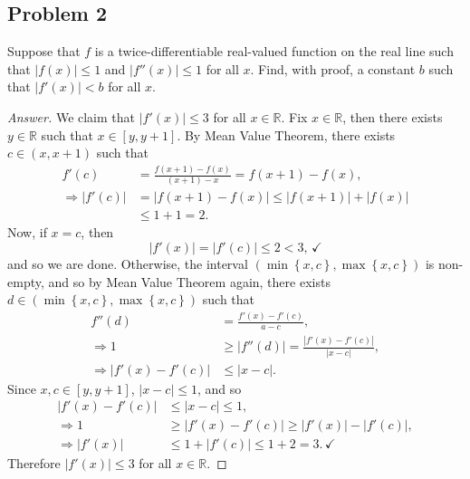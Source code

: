 \documentclass[12pt]{article}
\newcommand{\real}{\mathbb{R}}
\newcommand\paren[1]{\left( #1 \right)}
\newcommand\setb[1]{\left \{ #1 \right \}}
\newcommand{\abs}[1]{\left | #1 \right |}
\theoremstyle{definition}
\begin{document}
\subsection{Problem 2 \texorpdfstring{\cite{Melody}}{}}
Suppose that $f$ is a twice-differentiable real-valued function on the real line such that $\abs{ f(x) } \leq 1$ and $\abs{ f''(x) } \leq 1$ for all $x$. Find, with proof, a constant $b$ such that $\abs{ f'(x) } < b$ for all $x$.
\begin{proof}[Answer]
    We claim that $\abs{ f'(x) } \leq 3$ for all $x \in \real$. Fix $x \in \real$, then there exists $y \in \real$ such that $x \in [y,y+1]$. By Mean Value Theorem, there exists $c \in (x,x+1)$ such that 
    \begin{align*}
        f'(c) & = \frac{f(x+1) - f(x)}{(x+1) - x} = f(x+1) - f(x) , \\ 
        \Rightarrow \abs{ f'(c) } & = \abs{ f(x+1) - f(x) } \leq \abs{ f(x+1) } + \abs{ f(x) } \\ 
        & \leq 1 + 1 = 2 . 
    \end{align*}
    Now, if $x = c$, then 
    \[
        \abs{ f'(x) } = \abs{ f'(c) } \leq 2 < 3 , \, \checkmark
    \]
    and so we are done. Otherwise, the interval $\paren{ \min \setb{ x , c } , \max \setb{ x , c } }$ is non-empty, and so by Mean Value Theorem again, there exists $d \in \paren{ \min \setb{ x , c } , \max \setb{ x , c } }$ such that 
    \begin{align*}
        f''(d) & = \frac{f'(x) - f'(c)}{a - c} , \\
        \Rightarrow 1 & \geq \abs{ f''(d) } = \frac{ \abs{ f'(x) - f'(c) } }{ \abs{x - c} } , \\ 
        \Rightarrow \abs{ f'(x) - f'(c) } & \leq \abs{ x - c } . 
    \end{align*}
    Since $x , c \in [y,y+1]$, $\abs{x - c} \leq 1$, and so 
    \begin{align*}
        \abs{ f'(x) - f'(c) } & \leq \abs{ x - c } \leq 1 , \\ 
        \Rightarrow 1 & \geq \abs{ f'(x) - f'(c) } \geq \abs{ f'(x) } - \abs{ f'(c) } , \\ 
        \Rightarrow \abs{ f'(x) } & \leq 1 + \abs{ f'(c) } \leq 1 + 2 = 3 . \, \checkmark 
    \end{align*}
    Therefore $\abs{ f'(x) } \leq 3$ for all $x \in \real$. 
\end{proof}
\end{document}
